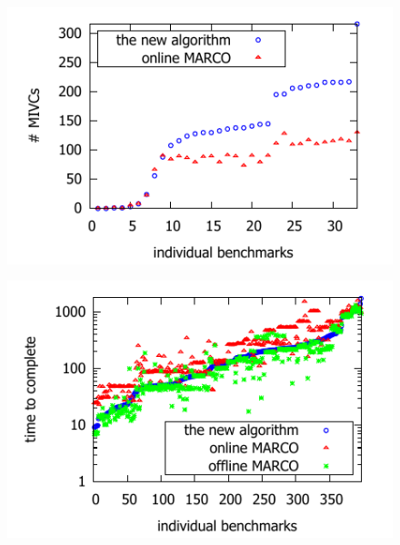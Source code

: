 \begin{figure}[!t]
\centering
\begin{minipage}{.48\textwidth}
\centering
\includegraphics[scale=0.8]{./plots/found_mivcs.pdf}%
%
\label{res:found_mivcs}
\end{minipage}\hfill
\begin{minipage}{.48\textwidth}
\centering
\includegraphics[scale=0.8]{./plots/time_to_complete.pdf}%
%
\label{res:time_to_complete}
\end{minipage}
\end{figure}



